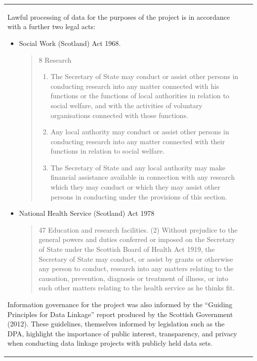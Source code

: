 \documentclass[12pt,a4paper,oneside,table]{report}
\begin{document}
\begin{tabular}[t]{ll}
\begin{itemize}[noitemsep]
\end{itemize}

Lawful processing of data for the purposes of the project is in
accordance with a further two legal acts:

\begin{itemize}[noitemsep]
\item Social Work (Scotland) Act 1968.
\begin{quotation} 8 Research \begin{enumerate}
\item The Secretary of State may conduct or assist other persons in conducting research into any matter connected with his functions or the functions of local authorities in relation to social welfare, and with the activities of voluntary organisations connected with those functions.
\item Any local authority may conduct or assist other persons in conducting research into any matter connected with their functions in relation to social welfare.
\item The Secretary of State and any local authority may make financial assistance available in connection with any research which they may conduct or which they may assist other persons in conducting under the provisions of this section.
\end{enumerate} \end{quotation}
\item National Health Service (Scotland) Act 1978
\begin{quotation} 47 Education and research facilities. (2) Without prejudice to the general powers and duties conferred or imposed on the Secretary of State under the Scottish Board of Health Act 1919, the Secretary of State may conduct, or assist by grants or otherwise any person to conduct, research into any matters relating to the causation, prevention, diagnosis or treatment of illness, or into such other matters relating to the health service as he thinks fit.
\end{quotation}
\end{itemize}

Information governance for the project was also informed by the
``Guiding Principles for Data Linkage'' report produced by the Scottish
Government (2012). These guidelines, themselves informed by legislation
such as the DPA, highlight the importance of public interest,
transparency, and privacy when conducting data linkage projects with
publicly held data sets.


\end{tabular}
\end{document}
